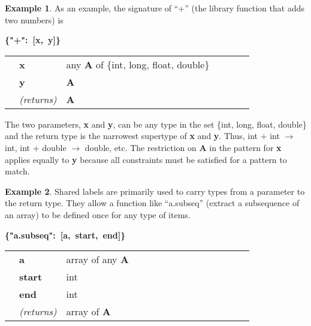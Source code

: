 \documentclass{article}
\newcommand{\PFAc}{\ttfamily\bfseries}
\newcommand{\PFAp}{\ttfamily\bfseries}
\newcommand{\PFAtp}{\ttfamily\bfseries}
\theoremstyle{definition}
\newtheorem{example}{Example}[section]
\begin{document}
\begin{example}
As an example, the signature of ``+'' (the library function that adds two numbers) is
\begin{center}
\begin{minipage}{0.9\linewidth}
\mbox{\PFAc \{"+":$\!$ [x, y]\} \vspace{0.2 cm} \\} \vspace{0.2 cm} \\ \rm \begin{tabular}{p{0.01\linewidth} l p{0.8\linewidth}} & \PFAc x \rm & any {\PFAtp A} of \{int, long, float, double\} \\  & \PFAc y \rm & {\PFAtp A} \\  & {\it (returns)} & {\PFAtp A} \\ \end{tabular}
\end{minipage}
\end{center}
The two parameters, {\PFAp x} and {\PFAp y}, can be any type in the set \{int, long, float, double\} and the return type is the narrowest supertype of {\PFAp x} and {\PFAp y}.  Thus, int $+$ int $\to$ int, int $+$ double $\to$ double, etc.  The restriction on {\PFAtp A} in the pattern for {\PFAp x} applies equally to {\PFAp y} because all constraints must be satisfied for a pattern to match.
\end{example}

\begin{example}
Shared labels are primarily used to carry types from a parameter to the return type.  They allow a function like ``a.subseq'' (extract a subsequence of an array) to be defined once for any type of items.
\begin{center}
\begin{minipage}{0.9\linewidth}
\mbox{\PFAc \{"a.subseq":$\!$ [a, start, end]\} \vspace{0.2 cm} \\} \vspace{0.2 cm} \\ \rm \begin{tabular}{p{0.01\linewidth} l p{0.8\linewidth}} & \PFAc a \rm & array of any {\PFAtp A} \\  & \PFAc start \rm & int \\  & \PFAc end \rm & int \\  & {\it (returns)} & array of {\PFAtp A} \\ \end{tabular}
\end{minipage}
\end{center}
\end{example}
\end{document}

